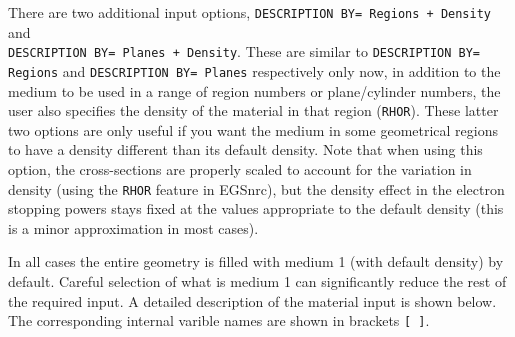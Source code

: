 \documentclass[12pt,twoside]{article}  %
\begin{document}
There are two additional input options, {\tt DESCRIPTION BY= Regions + Density}
and\\
 {\tt DESCRIPTION BY= Planes + Density}.  These are similar to
{\tt DESCRIPTION BY= Regions} and {\tt DESCRIPTION BY= Planes} respectively
only now, in addition to the medium to be used in a range of region numbers
or plane/cylinder numbers, the user also specifies the
density of the material in that region ({\tt RHOR}).
These latter two options are only useful if 
you want the medium in some geometrical regions to have a density different
than its default density.  Note that when using this option, the
cross-sections are properly scaled to account for the variation in density
(using the {\tt RHOR} feature in EGSnrc), but the density effect in the
electron stopping powers stays fixed at the values appropriate to the
default density (this is a minor approximation in most cases).
 
In all cases the entire geometry is filled with medium 1 (with default
density) by
 default.  Careful selection of what is medium 1 can significantly reduce
the rest of the required input.  A detailed description of the material
input is shown below. The corresponding internal varible
names are shown in brackets \verb+[ ]+.
\end{document}
